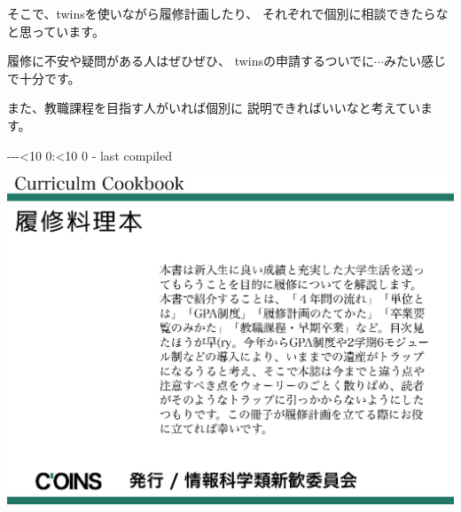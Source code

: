 \documentclass[a4j]{jsarticle}
\newcommand{\niketa}[1]{\ifnum#1<10 0#1\else#1\fi}
\newcommand{\modtoday}{\the\year-\the\month-\the\day-\niketa{\the\hour}:\niketa{\the\minute} - last compiled}
\begin{document}
\noindent そこで、twinsを使いながら履修計画したり、
それぞれで個別に相談できたらなと思っています。

\noindent 履修に不安や疑問がある人はぜひぜひ、
twinsの申請するついでに$\cdots$みたい感じで十分です。

\noindent また、教職課程を目指す人がいれば個別に
説明できればいいなと考えています。

\hspace{\fill}\modtoday
\newpage
\thispagestyle{empty}
\vspace*{-1truein}%
\vspace*{-\topmargin}
\vspace*{-\headheight}
\vspace*{-\headsep}
\vspace*{-\topskip}
\vspace{14cm}
\begin{center}%
\noindent
\hspace*{-1in}
\includegraphics[width=1.1\fullwidth]{pic/hyousi/oreilly-back.eps}%
\hspace*{-1in}
\vspace*{-10cm}
\end{center}
\end{document}
